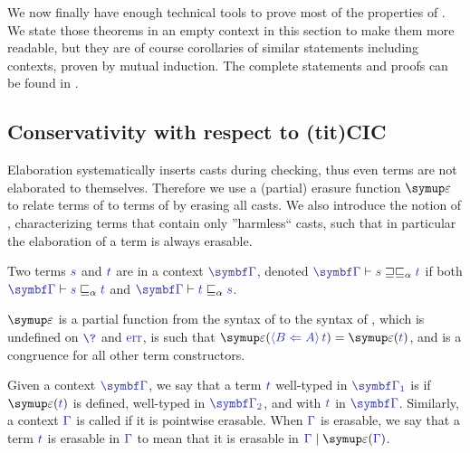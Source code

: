 We now finally have enough technical tools to prove most of the properties of .
%
We state those theorems in an empty context in this section to make
them more readable, but they are of course corollaries of similar
statements including contexts, proven by mutual induction. The complete
statements and proofs can be found in .

\subsection{Conservativity with respect to \kl(tit){CIC}}

Elaboration systematically inserts casts during checking, thus even
 terms are not elaborated to themselves. Therefore we use a (partial) erasure function $\eras$ to relate terms of  to terms of  by erasing all casts.
We also introduce the notion of ,
characterizing terms that contain only ”harmless“ casts,
such that in particular the elaboration of a  term is always erasable.

\begin{definition}
  \label{def:equipre}
	Two terms $\tcol{s}$ and $\tcol{t}$ are  in a context
  $\tcol{\GG}$, denoted $\tcol{\GG} \vdash \tcol{s} \caequipre \tcol{t}$ if both $\tcol{\GG} \vdash \tcol{s} \capre \tcol{t}$ and $\tcol{\GG} \vdash \tcol{t} \capre \tcol{s}$.
\end{definition}

\begin{definition}
  \label{def:erasure}
	 $\eras$ is a partial function from the syntax of  to the syntax of
  , which is undefined on $\tcol{\?}$ and $\tcol{\err}$,
  is such that $\eras(\tcol{\cast{A}{B}{t}}) = \eras(\tcol{t})$,
  and is a congruence for all other term constructors.

	Given a context $\tcol{\GG}$, we say that a term $\tcol{t}$ well-typed in $\tcol{\fs{\GG}}$
  is  if $\eras(\tcol{t})$ is defined, well-typed in $\tcol{\sn{\GG}}$,
  and  with $\tcol{t}$ in $\tcol{\GG}$.
  Similarly, a context $\tcol{\Gamma}$ is called  if it is pointwise erasable.
  When $\tcol{\Gamma}$ is erasable, we say that a term $\tcol{t}$ is erasable in
  $\tcol{\Gamma}$ to mean that it is erasable in $\tcol{\Gamma} \mid \eras(\tcol{\Gamma})$.
\end{definition}

